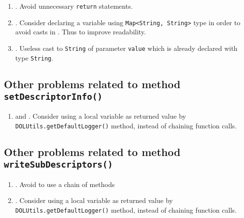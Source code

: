 \begin{enumerate}
	\item {}. Avoid unnecessary \texttt{return} statements.
	\item {}. Consider declaring a variable using \texttt{Map<String, String>} type in order to avoid casts in . Thus to improve readability.
	\item {}. Useless cast to \texttt{String} of parameter \texttt{value} which is already declared with type \texttt{String}.
\end{enumerate}

\subsection{Other problems related to method \texttt{setDescriptorInfo()}}
\begin{enumerate}
	\item {} and . Consider using a local variable as returned value by  \texttt{DOLUtils.getDefaultLogger()} method, instead of chaining function calls.
\end{enumerate}

\subsection{Other problems related to method \texttt{writeSubDescriptors()}}
\begin{enumerate}
\item {}. Avoid to use a chain of methods
\item {}. Consider using a local variable as returned value by \texttt{DOLUtils.getDefaultLogger()} method, instead of chaining function calls.
\end{enumerate}
